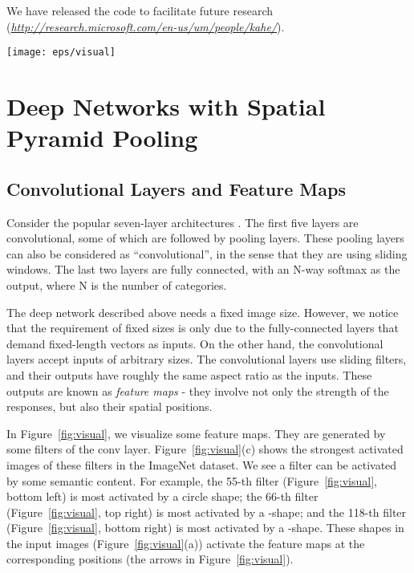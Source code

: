 \documentclass[10pt,journal,cspaper,compsoc]{IEEEtran}
\begin{document}
We have released the code to facilitate future research (\emph{\small\url{http://research.microsoft.com/en-us/um/people/kahe/}}).

\begin{figure*}[t]
\center
\texttt{[image: eps/visual]}
\caption{Visualization of the feature maps. (a) Two images in Pascal VOC 2007. (b) The feature maps of some conv filters. The arrows indicate the strongest responses and their corresponding positions in the images. (c) The ImageNet images that have the strongest responses of the corresponding filters. The green rectangles mark the receptive fields of the strongest responses.}
\label{fig:visual}
\end{figure*}

\section{Deep Networks with Spatial Pyramid Pooling}

\subsection{Convolutional Layers and Feature Maps}

Consider the popular seven-layer architectures \cite{Krizhevsky2012,Zeiler2013}. The first five layers are convolutional, some of which are followed by pooling layers. These pooling layers can also be considered as ``convolutional'', in the sense that they are using sliding windows. The last two layers are fully connected, with an N-way softmax as the output, where N is the number of categories.

The deep network described above needs a fixed image size.
However, we notice that the requirement of fixed sizes is only due to the fully-connected layers that demand fixed-length vectors as inputs. On the other hand, the convolutional layers accept inputs of arbitrary sizes. The convolutional layers use sliding filters, and their outputs have roughly the same aspect ratio as the inputs.
These outputs are known as \emph{feature maps} \cite{LeCun1989} - they involve not only the strength of the responses, but also their spatial positions.

In Figure~\ref{fig:visual}, we visualize some feature maps. They are generated by some filters of the conv layer. Figure~\ref{fig:visual}(c) shows the strongest activated images of these filters in the ImageNet dataset. We see a filter can be activated by some semantic content. For example, the 55-th filter (Figure~\ref{fig:visual}, bottom left) is most activated by a circle shape; the 66-th filter (Figure~\ref{fig:visual}, top right) is most activated by a -shape; and the 118-th filter (Figure~\ref{fig:visual}, bottom right) is most activated by a -shape. These shapes in the input images (Figure~\ref{fig:visual}(a)) activate the feature maps at the corresponding positions (the arrows in Figure~\ref{fig:visual}).
\end{document}
